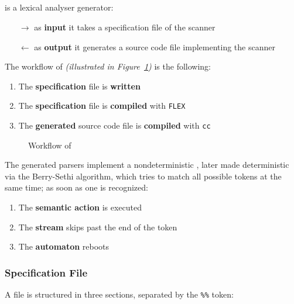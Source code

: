 \documentclass[english]{article}
\begin{document}
\subsection{\flex}
\flex is a lexical analyser generator:

\begin{itemize}
  \item[\(\rightarrow\)] as \textbf{input} it takes a specification file of the scanner
  \item[\(\leftarrow\)] as \textbf{output} it generates a \clang source code file implementing the scanner
\end{itemize}

The workflow of \flex \textit{(illustrated in Figure~\ref{fig:flex-workflow})} is the following:

\begin{enumerate}
  \item The \textbf{specification} file is \textbf{written}
  \item The \textbf{specification} file is \textbf{compiled} with \texttt{FLEX}
  \item The \textbf{generated} \clang source code file is \textbf{compiled} with \texttt{cc}
\end{enumerate}

\begin{figure}[htbp]
  \centering
  \bigskip
  \caption{Workflow of \flex}
  \label{fig:flex-workflow}
  \bigskip
\end{figure}

The generated parsers implement a nondeterministic \FSA, later made deterministic via the Berry-Sethi algorithm, which tries to match all possible tokens at the same time;
as soon as one is recognized:

\begin{enumerate}
  \item The \textbf{semantic action} is executed
  \item The \textbf{stream} skips past the end of the token
  \item The \textbf{automaton} reboots
\end{enumerate}

\subsubsection{Specification File}

A \flex file is structured in three sections, separated by the \texttt{\%\%} token:
\end{document}
